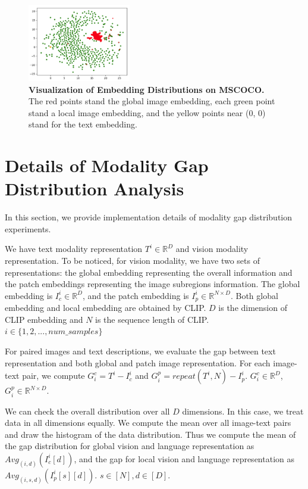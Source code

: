 \begin{figure}[tb]
  \centering
  \includegraphics[width=0.4\textwidth]{AnonymousSubmission/LaTeX/asserts/nips_sup_vis.png}
   \caption{\textbf{Visualization of Embedding Distributions on MSCOCO.} The red points stand the global image embedding, each green point stand a local image embedding, and the yellow points near (0, 0) stand for the text embedding.}
    \label{figure:visulization}
    \vspace{-0.2cm}
\end{figure}


\section{Details of Modality Gap Distribution Analysis} 
In this section, we provide implementation details of modality gap distribution experiments.

We have text modality representation $T^i \in \mathbb{R}^D$ and vision modality representation. To be noticed, for vision modality, we have two sets of representations: the global embedding representing the overall information and the patch embeddings representing the image subregions information. The global embedding is $I_c^i \in \mathbb{R}^D$, and the patch embedding is $I_p^i \in \mathbb{R}^{N \times D}$. Both global embedding and local embedding are obtained by CLIP. $D$ is the dimension of CLIP embedding and $N$ is the sequence length of CLIP. $i \in \{1, 2, ... , num\_samples\}$

For paired images and text descriptions, we evaluate the gap between text representation and both global and patch image representation. For each image-text pair, we compute $G^c_i = T^i - I_c^i$ and $G^p_i = repeat(T^i, N) - I_p^i$. $G^c_i \in \mathbb{R}^{D}$, $G^p_i \in \mathbb{R}^{N \times D}$.

We can check the overall distribution over all $D$ dimensions. In this case, we treat data in all dimensions equally. We compute the mean over all image-text pairs and draw the histogram of the data distribution. Thus we compute the mean of the gap distribution for global vision and language representation as $Avg_{(i, d)} (I_c^i[d])$, and the gap for local vision and language representation as $Avg_{(i, s, d)} (I_p^i[s][d])$. $s \in [N], d \in [D]$.



